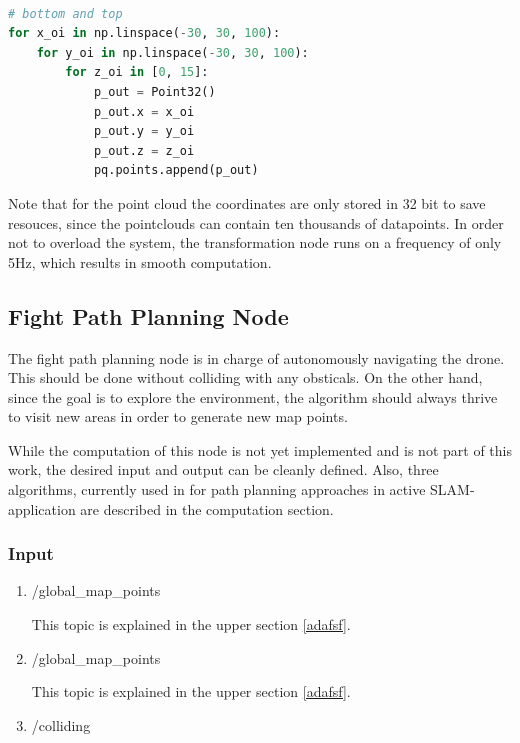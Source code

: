 	\begin{lstlisting}[language=python, caption=Adding upper and lower restrictions to pointcloud. , label=lst:const]
	
# bottom and top 
for x_oi in np.linspace(-30, 30, 100): 
	for y_oi in np.linspace(-30, 30, 100): 
		for z_oi in [0, 15]: 
			p_out = Point32()
			p_out.x = x_oi
			p_out.y = y_oi
			p_out.z = z_oi
			pq.points.append(p_out)

	\end{lstlisting}

	Note that for the point cloud the coordinates are only stored in 32 bit to save resouces, since the pointclouds can contain ten thousands of datapoints. In order not 
	to overload the system, the transformation node runs on a frequency of only 5Hz, which results in smooth computation. 
	
	\subsection{Fight Path Planning Node}
	
	The fight path planning node is in charge of autonomously navigating the drone. This should be done without colliding with any obsticals. 
	On the other hand, since the goal is to explore the environment, the algorithm should always thrive to visit new areas in order to generate 
	new map points. 
	
	While the computation of this node is not yet implemented and is not part of this work, the desired input and output can be cleanly defined. 
	Also, three algorithms, currently used in for path planning approaches in active SLAM-application are described in the computation section. 
	
	\subsubsection{Input}
	
	\begin{enumerate}
	\item{/global\_map\_points}
	
	This topic is explained in the upper section \ref{adafsf}. 
	
	\item{/global\_map\_points}
	
	This topic is explained in the upper section \ref{adafsf}.
	
	\item{/colliding}
	
	
	\end{enumerate}
	
